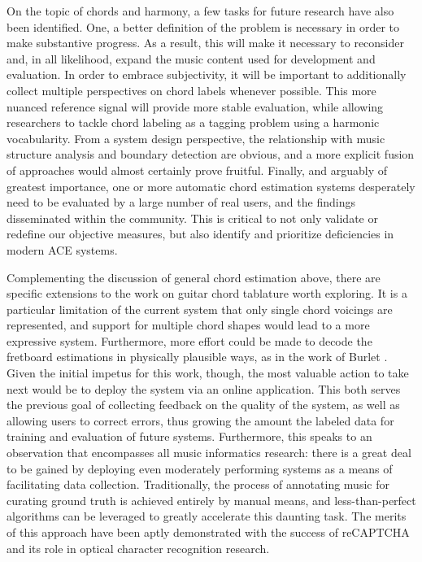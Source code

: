 On the topic of chords and harmony, a few tasks for future research have also been identified.
One, a better definition of the problem is necessary in order to make substantive progress.
As a result, this will make it necessary to reconsider and, in all likelihood, expand the music content used for development and evaluation.
In order to embrace subjectivity, it will be important to additionally collect multiple perspectives on chord labels whenever possible.
This more nuanced reference signal will provide more stable evaluation, while allowing researchers to tackle chord labeling as a tagging problem using a harmonic vocabularity.
From a system design perspective, the relationship with music structure analysis and boundary detection are obvious, and a more explicit fusion of approaches would almost certainly prove fruitful.
Finally, and arguably of greatest importance, one or more automatic chord estimation systems desperately need to be evaluated by a large number of real users, and the findings disseminated within the community.
This is critical to not only validate or redefine our objective measures, but also identify and prioritize deficiencies in modern ACE systems.

Complementing the discussion of general chord estimation above, there are specific extensions to the work on guitar chord tablature worth exploring.
It is a particular limitation of the current system that only single chord voicings are represented, and support for multiple chord shapes would lead to a more expressive system.
Furthermore, more effort could be made to decode the fretboard estimations in physically plausible ways, as in the work of Burlet \cite{Burlet2013Robotaba}.
Given the initial impetus for this work, though, the most valuable action to take next would be to deploy the system via an online application.
This both serves the previous goal of collecting feedback on the quality of the system, as well as allowing users to correct errors, thus growing the amount the labeled data for training and evaluation of future systems.
Furthermore, this speaks to an observation that encompasses all music informatics research:
there is a great deal to be gained by deploying even moderately performing systems as a means of facilitating data collection.
Traditionally, the process of annotating music for curating ground truth is achieved entirely by manual means, and less-than-perfect algorithms can be leveraged to greatly accelerate this daunting task.
The merits of this approach have been aptly demonstrated with the success of reCAPTCHA and its role in optical character recognition research.

